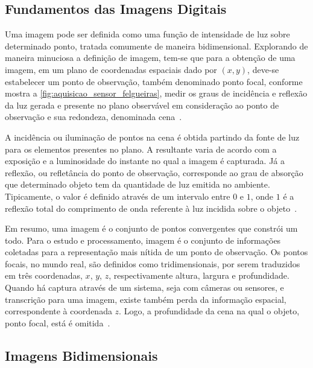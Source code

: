 \documentclass[12pt,oneside,a4paper,chapter=TITLE,section=TITLE,sumario=tradicional]{abntex2}
\begin{document}
\subsection{Fundamentos das Imagens Digitais}

Uma imagem pode ser definida como uma função de intensidade de luz sobre determinado ponto, tratada comumente de maneira bidimensional. Explorando de maneira minuciosa a definição de imagem, tem-se que para a obtenção de uma imagem, em um plano de coordenadas espaciais dado por $(x, y)$, deve-se estabelecer um ponto de observação, também denominado ponto focal, conforme mostra a \autoref{fig:aquisicao_sensor_felgueiras}, medir os graus de incidência e reflexão da luz gerada e presente no plano observável em consideração ao ponto de observação e sua redondeza, denominada cena~\cite{pdi2006}.

\begin{figure}[htb]
\end{figure}

A incidência ou iluminação de pontos na cena é obtida partindo da fonte de luz para os elementos presentes no plano. A resultante varia de acordo com a exposição e a luminosidade do instante no qual a imagem é capturada. Já a reflexão, ou refletância do ponto de observação, corresponde ao grau de absorção que determinado objeto tem da quantidade de luz emitida no ambiente. Tipicamente, o valor é definido através de um intervalo entre $0$ e $1$, onde $1$ é a reflexão total do comprimento de onda referente à luz incidida sobre o objeto~\cite{pdi2006}.

Em resumo, uma imagem é o conjunto de pontos convergentes que constrói um todo. Para o estudo e processamento, imagem é o conjunto de informações coletadas para a representação mais nítida de um ponto de observação. Os pontos focais, no mundo real, são definidos como tridimensionais, por serem traduzidos em três coordenadas, $x$, $y$, $z$, respectivamente altura, largura e profundidade. Quando há captura através de um sistema, seja com câmeras ou sensores, e transcrição para uma imagem, existe também perda da informação espacial, correspondente à coordenada $z$. Logo, a profundidade da cena na qual o objeto, ponto focal, está é omitida~\cite{pdi2006}.

\subsection{Imagens Bidimensionais}
\end{document}
